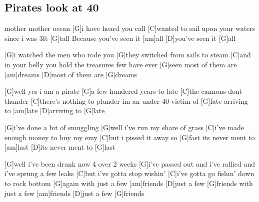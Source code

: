 \subsection*{Pirates look at 40   }
\begin{guitar}
[G]mother mother ocean
[G]i have heard you call
[C]wanted to sail upon your waters
since i was 3ft [G]tall
Because you've seen it [am]all
[D]you've seen it [G]all



[G]i watched the men who rode you
[G]they switched from sails to steam
[C]and in your belly you hold the treasures
few have ever [G]seen
most of them are [am]dreams
[D]most of them are [G]dreams



[G]well yes i am a pirate
[G]a few hundered years to late
[C]the cannons dont thunder
[C]there's nothing to plunder
im an under 40 victim of [G]fate
arriving to [am]late
[D]arriving to [G]late



[G]i've done a bit of smuggling
[G]well i've run my share of grass
[C]i've made enough money to buy my emy
[C]but i pissed it away so [G]fast
its never ment to [am]last
[D]its never ment to [G]last



[G]well i've been drunk now 4 over 2 weeks
[G]i've passed out and i've rallied and i've sprung a few leaks
[C]but i've gotta stop wishin'
[C]i've gotta go fishin'
down to rock bottom [G]again
with just a few [am]friends
[D]just a few [G]friends
with just a few [am]friends
[D]just a few [G]friends
\end{guitar}
